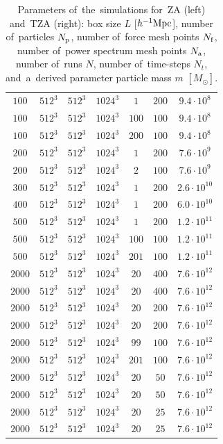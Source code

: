 \begin{landscape}
\begin{table}
{\begin{tabular}{ ccccccc }
    \hline
    $100$ & $512^3$ & $512^3$ & $1024^3$ & $1$ & $200$ & $9.4\cdot10^{8}$\\
    $100$ & $512^3$ & $512^3$ & $1024^3$ & $100$ & $100$ & $9.4\cdot10^{8}$\\
    $100$ & $512^3$ & $512^3$ & $1024^3$ & $200$ & $100$ & $9.4\cdot10^{8}$\\
    $200$ & $512^3$ & $512^3$ & $1024^3$ & $1$ & $200$ & $7.6\cdot10^{9}$\\
    $200$ & $512^3$ & $512^3$ & $1024^3$ & $2$ & $100$ & $7.6\cdot10^{9}$\\
    $300$ & $512^3$ & $512^3$ & $1024^3$ & $1$ & $200$ & $2.6\cdot10^{10}$\\
    $400$ & $512^3$ & $512^3$ & $1024^3$ & $1$ & $200$ & $6.0\cdot10^{10}$\\
    $500$ & $512^3$ & $512^3$ & $1024^3$ & $1$ & $200$ & $1.2\cdot10^{11}$\\
    $500$ & $512^3$ & $512^3$ & $1024^3$ & $100$ & $100$ & $1.2\cdot10^{11}$\\
    $500$ & $512^3$ & $512^3$ & $1024^3$ & $201$ & $100$ & $1.2\cdot10^{11}$\\
    $2000$ & $512^3$ & $512^3$ & $1024^3$ & $20$ & $400$ & $7.6\cdot10^{12}$\\
    $2000$ & $512^3$ & $512^3$ & $1024^3$ & $20$ & $400$ & $7.6\cdot10^{12}$\\
    $2000$ & $512^3$ & $512^3$ & $1024^3$ & $20$ & $200$ & $7.6\cdot10^{12}$\\
    $2000$ & $512^3$ & $512^3$ & $1024^3$ & $20$ & $200$ & $7.6\cdot10^{12}$\\
    $2000$ & $512^3$ & $512^3$ & $1024^3$ & $99$ & $100$ & $7.6\cdot10^{12}$\\
    $2000$ & $512^3$ & $512^3$ & $1024^3$ & $201$ & $100$ & $7.6\cdot10^{12}$\\
    $2000$ & $512^3$ & $512^3$ & $1024^3$ & $20$ & $50$ & $7.6\cdot10^{12}$\\
    $2000$ & $512^3$ & $512^3$ & $1024^3$ & $20$ & $50$ & $7.6\cdot10^{12}$\\
    $2000$ & $512^3$ & $512^3$ & $1024^3$ & $20$ & $25$ & $7.6\cdot10^{12}$\\
    $2000$ & $512^3$ & $512^3$ & $1024^3$ & $20$ & $25$ & $7.6\cdot10^{12}$\\
    \hline
    \end{tabular}
    }
    \caption{Parameters of~the~simulations for~ZA (left) and~TZA (right): box size $L$ [$h^{-1}\text{Mpc}$], number of~particles $N_{\rm p}$, number of~force mesh points $N_{\rm f}$, number of~power spectrum mesh points $N_{\rm a}$, number of~runs $N$, number of~time-steps $N_t$, and~a~derived parameter particle mass $m$ $[M_\odot]$.}
    \label{tab:sim_param_ZA_TZA}
    \end{table}
    

\end{landscape}
